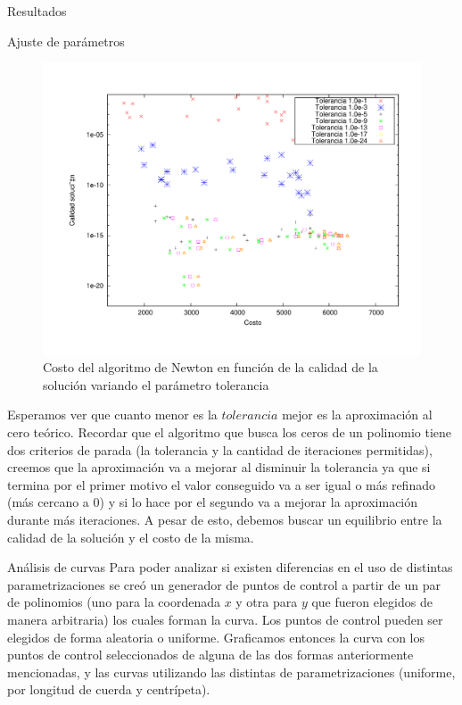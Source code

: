\begin{section}{Resultados}
\begin{subsection}{Ajuste de parámetros}
		\begin{figure}[H]
		  \centering
			\includegraphics[width=14cm]{graficos/tol_graf.pdf}
		  \caption{Costo del algoritmo de Newton en función de la calidad de la solución variando el parámetro tolerancia}
		  \label{fig:tol}
		\end{figure}
		
		\VSP
		
		Esperamos ver que cuanto menor es la $tolerancia$ mejor es la aproximación al cero teórico. Recordar que el algoritmo que busca los ceros de un polinomio tiene dos criterios de parada (la tolerancia y la cantidad de iteraciones permitidas), creemos que la aproximación va a mejorar al disminuir la tolerancia ya que si termina por el primer motivo el valor conseguido va a ser igual o más refinado (más cercano a 0) y si lo hace por el segundo va a mejorar la aproximación durante más iteraciones. A pesar de esto, debemos buscar un equilibrio entre la calidad de la solución y el costo de la misma.\\
		
	\end{subsection}

	\begin{subsection}{Análisis de curvas}
		Para poder analizar si existen diferencias en el uso de distintas parametrizaciones se creó un generador de puntos de control a partir de un par de polinomios (uno para la coordenada $x$ y otra para $y$ que fueron elegidos de manera arbitraria) los cuales forman la curva. Los puntos de control pueden ser elegidos de forma aleatoria o uniforme. Graficamos entonces la curva con los puntos de control seleccionados de alguna de las dos formas anteriormente mencionadas, y las curvas utilizando las distintas de parametrizaciones (uniforme, por longitud de cuerda y centrípeta).
		

\end{subsection}
\end{section}
